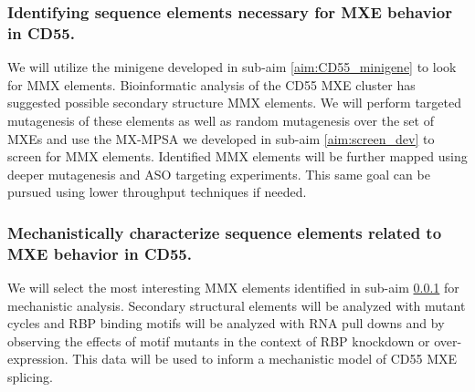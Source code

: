 \documentclass{article}
\begin{document}
\subsubsection{Identifying sequence elements necessary for MXE behavior in CD55.} \label{aim:CD55_motif_finding}
We will utilize the minigene developed in sub-aim \ref{aim:CD55_minigene} to look for MMX elements.
Bioinformatic analysis of the CD55 MXE cluster has suggested possible secondary structure MMX elements.\Cite{Hatje2017-oj} 
We will perform targeted mutagenesis of these elements as well as random mutagenesis over the set of MXEs and use the MX-MPSA we developed in sub-aim \ref{aim:screen_dev} to screen for MMX elements. 
Identified MMX elements will be further mapped using deeper mutagenesis and ASO targeting experiments.
This same goal can be pursued using lower throughput techniques if needed.
%
\subsubsection{Mechanistically characterize sequence elements related to MXE behavior in CD55.} \label{aim:CD55_mechanistic}
We will select the most interesting MMX elements identified in sub-aim \ref{aim:CD55_motif_finding} for mechanistic analysis.
Secondary structural elements will be analyzed with mutant cycles and RBP binding motifs will be analyzed with RNA pull downs and by observing the effects of motif mutants in the context of RBP knockdown or over-expression.
This data will be used to inform a mechanistic model of CD55 MXE splicing.






\printbibliography
\end{document}
